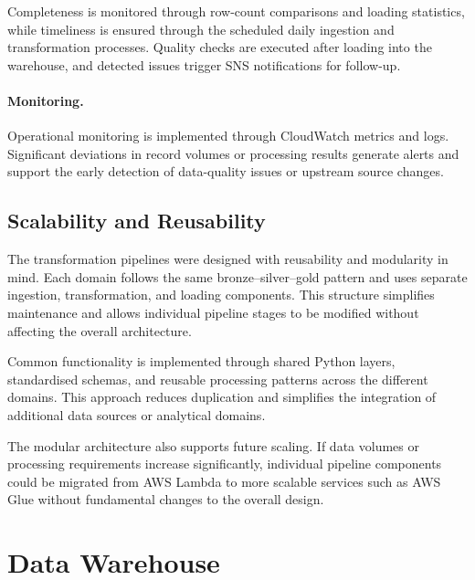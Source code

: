 \documentclass[11pt,a4paper]{article}
\begin{document}
Completeness is monitored through row-count comparisons and loading
statistics, while timeliness is ensured through the scheduled daily
ingestion and transformation processes. Quality checks are executed
after loading into the warehouse, and detected issues trigger SNS
notifications for follow-up.

\paragraph{Monitoring.}
Operational monitoring is implemented through CloudWatch metrics and
logs. Significant deviations in record volumes or processing results
generate alerts and support the early detection of data-quality issues
or upstream source changes.

\subsection{Scalability and Reusability}
\label{sec:scalability}

The transformation pipelines were designed with reusability and
modularity in mind. Each domain follows the same bronze--silver--gold
pattern and uses separate ingestion, transformation, and loading
components. This structure simplifies maintenance and allows
individual pipeline stages to be modified without affecting the
overall architecture.

Common functionality is implemented through shared Python layers,
standardised schemas, and reusable processing patterns across the
different domains. This approach reduces duplication and simplifies
the integration of additional data sources or analytical domains.

The modular architecture also supports future scaling. If data
volumes or processing requirements increase significantly, individual
pipeline components could be migrated from AWS Lambda to more scalable
services such as AWS Glue without fundamental changes to the overall
design.

\newpage

\section{Data Warehouse}
\label{sec:data_warehouse}
\end{document}
